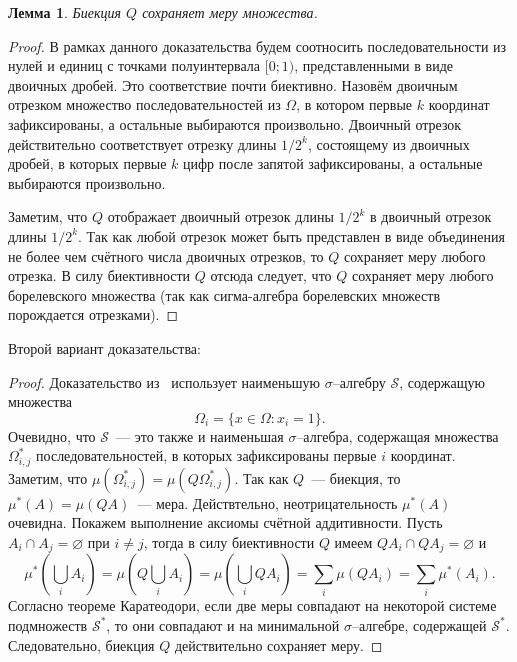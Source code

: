 \documentclass[a4paper,14pt]{article} %
\theoremstyle{plain}
\newtheorem{lemma}{Лемма}%
\begin{document}
\begin{lemma}
	Биекция $Q$ сохраняет меру множества.
\end{lemma}

\begin{proof}
	В рамках данного доказательства будем соотносить последовательности из нулей и единиц
	с точками полуинтервала $[0;1)$, представленными в виде двоичных дробей.
	Это соответствие почти биективно.
	Назовём двоичным отрезком множество последовательностей из $\Omega$,
	в котором первые $k$ координат зафиксированы, а остальные выбираются произвольно.
	Двоичный отрезок действительно соответствует отрезку длины $1/2^k$,
	состоящему из двоичных дробей, в которых первые $k$ цифр после запятой зафиксированы,
	а остальные выбираются произвольно.

	Заметим, что $Q$ отображает двоичный отрезок длины $1/2^k$ в двоичный отрезок длины $1/2^k$.
	Так как любой отрезок может быть представлен в виде объединения не более чем счётного числа
	двоичных отрезков, то $Q$ сохраняет меру любого отрезка.
	В силу биективности $Q$ отсюда следует, что $Q$ сохраняет меру любого борелевского множества
	(так как сигма-алгебра борелевских множеств порождается отрезками).
\end{proof}

Второй вариант доказательства:
\begin{proof}
	Доказательство из~\cite{connor1990almost} использует наименьшую $\sigma$--алгебру $\mathcal{S}$,
	содержащую множества
	\begin{equation}
		\Omega_i = \{x\in\Omega: x_i = 1\}
		.
	\end{equation}
	Очевидно, что $\mathcal{S}$~--- это также и наименьшая $\sigma$--алгебра, содержащая множества
	$\Omega^*_{i,j}$ последовательностей, в которых зафиксированы первые $i$ координат.
	Заметим, что $\mu(\Omega^*_{i,j}) = \mu(Q\Omega^*_{i,j})$.
	Так как $Q$~--- биекция, то $\mu^*(A) = \mu(QA)$~--- мера.
	Действтельно, неотрицательность $\mu^*(A)$ очевидна.
	Покажем выполнение аксиомы счётной аддитивности.
	Пусть $A_i \cap A_j = \varnothing$ при $i\neq j$,
	тогда в силу биективности $Q$ имеем $QA_i \cap QA_j = \varnothing$ и
	\begin{equation}
		\mu^*\left( \bigcup_i A_i \right)
		=
		\mu\left( Q \bigcup_i A_i \right)
		=
		\mu\left( \bigcup_i QA_i \right)
		=
		\sum_i 	\mu( QA_i )
		=
		\sum_i 	\mu^*( A_i )
		.
	\end{equation}
	Согласно теореме Каратеодори,
	если две меры совпадают на некоторой системе подмножеств $\mathcal{S}^*$,
	то они совпадают и на минимальной $\sigma$--алгебре, содержащей $\mathcal{S}^*$.
	Следовательно, биекция $Q$ действительно сохраняет меру.
\end{proof}
\end{document}
